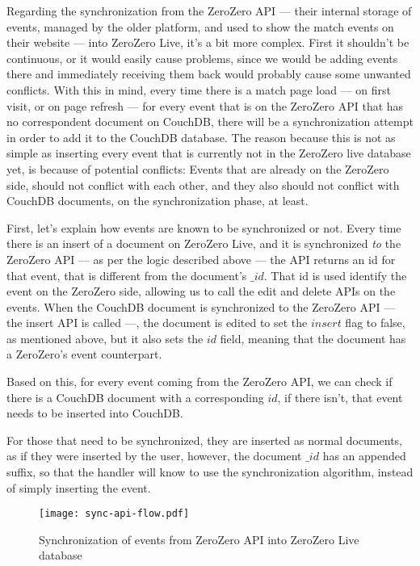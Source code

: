 Regarding the synchronization from the ZeroZero API --- their internal storage of events, managed by the older platform, and used to show the match events on their website --- into ZeroZero Live, it's a bit more complex. First it shouldn't be continuous, or it would easily cause problems, since we would be adding events there and immediately receiving them back would probably cause some unwanted conflicts. With this in mind, every time there is a match page load --- on first visit, or on page refresh --- for every event that is on the ZeroZero API that has no correspondent document on CouchDB, there will be a synchronization attempt in order to add it to the CouchDB database. The reason because this is not as simple as inserting every event that is currently not in the ZeroZero live database yet, is because of potential conflicts: Events that are already on the ZeroZero side, should not conflict with each other, and they also should not conflict with CouchDB documents, on the synchronization phase, at least.

First, let's explain how events are known to be synchronized or not. Every time there is an insert of a document on ZeroZero Live, and it is synchronized \textit{to} the ZeroZero API --- as per the logic described above --- the API returns an id for that event, that is different from the document's $\_id$. That id is used identify the event on the ZeroZero side, allowing us to call the edit and delete APIs on the events. When the CouchDB document is synchronized to the ZeroZero API --- the insert API is called ---, the document is edited to set the $insert$ flag to false, as mentioned above, but it also sets the $id$ field, meaning that the document has a ZeroZero's event counterpart.

Based on this, for every event coming from the ZeroZero API, we can check if there is a CouchDB document with a corresponding $id$, if there isn't, that event needs to be inserted into CouchDB.

For those that need to be synchronized, they are inserted as normal documents, as if they were inserted by the user, however, the document $\_id$ has an appended  suffix, so that the handler will know to use the synchronization algorithm, instead of simply inserting the event.

\begin{figure}[h]
    \begin{center}
        \leavevmode
        \texttt{[image: sync-api-flow.pdf]}
        \caption{Synchronization of events from ZeroZero API into ZeroZero Live database}
        \label{fig:sync-from-api-flux}
    \end{center}
\end{figure}

